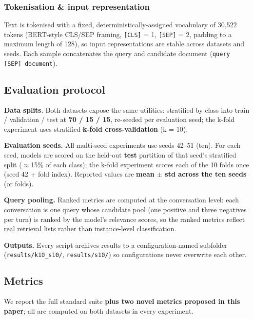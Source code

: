 \subsubsection{Tokenisation \& input representation}

Text is tokenised with a fixed, deterministically-assigned vocabulary of 30,522 tokens (BERT-style CLS/SEP framing, \texttt{[CLS]} = 1, \texttt{[SEP]} = 2, padding to a maximum length of 128), so input representations are stable across datasets and seeds. Each sample concatenates the query and candidate document (\texttt{query [SEP] document}).

\subsection{Evaluation protocol}
\label{sec:datasets-protocol}

\textbf{Data splits.} Both datasets expose the same utilities: stratified by class into train / validation / test at \textbf{70 / 15 / 15}, re-seeded per evaluation seed; the k-fold experiment uses stratified \textbf{k-fold cross-validation} (k = 10).

\textbf{Evaluation seeds.} All multi-seed experiments use seeds 42--51 (ten). For each seed, models are scored on the held-out \textbf{test} partition of that seed's stratified split ($\approx$15\% of each class); the k-fold experiment scores each of the 10 folds once (seed 42 + fold index). Reported values are \textbf{mean $\pm$ std across the ten seeds} (or folds).

\textbf{Query pooling.} Ranked metrics are computed at the conversation level: each conversation is one query whose candidate pool (one positive and three negatives per turn) is ranked by the model's relevance scores, so the ranked metrics reflect real retrieval lists rather than instance-level classification.

\textbf{Outputs.} Every script archives results to a configuration-named subfolder (\texttt{results/k10\_s10/}, \texttt{results/s10/}) so configurations never overwrite each other.

\subsection{Metrics}
\label{sec:datasets-metrics}

We report the full standard suite \textbf{plus two novel metrics proposed in this paper}; all are computed on both datasets in every experiment.

